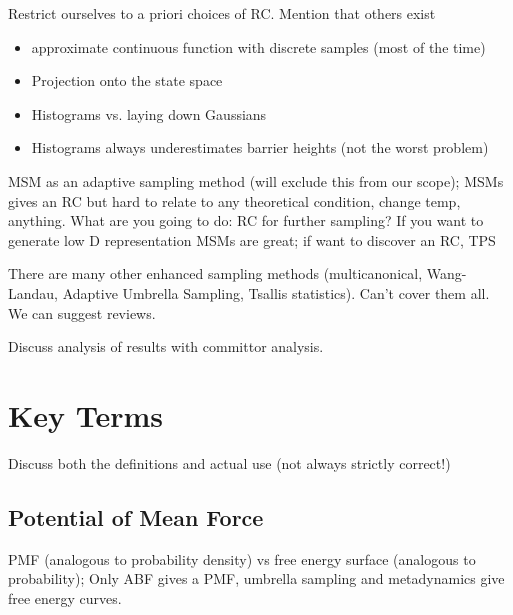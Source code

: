 \documentclass[9pt]{livecoms}
\begin{document}
Restrict ourselves to a priori choices of RC. Mention that others exist
\begin{itemize}
\item approximate continuous function with discrete samples (most of the time)
\item Projection onto the state space
\item Histograms vs. laying down Gaussians
\item Histograms always underestimates barrier heights (not the worst problem)
\end{itemize}

MSM as an adaptive sampling method (will exclude this from our scope);
MSMs gives an RC but hard to relate to any theoretical condition, change temp, anything.
What are you going to do: RC for further sampling? If you want to generate low D representation MSMs are great; if want to discover an RC, TPS



There are many other enhanced sampling methods (multicanonical, Wang-Landau, Adaptive Umbrella Sampling, Tsallis statistics).  Can't cover them all. We can suggest reviews.

Discuss analysis of results with committor analysis.

\section{Key Terms}

Discuss both the definitions and actual use (not always strictly correct!)

\subsection{Potential of Mean Force}


PMF (analogous to probability density)  vs free energy surface (analogous to probability); Only ABF gives a PMF, umbrella sampling and metadynamics give free energy curves.
\end{document}
